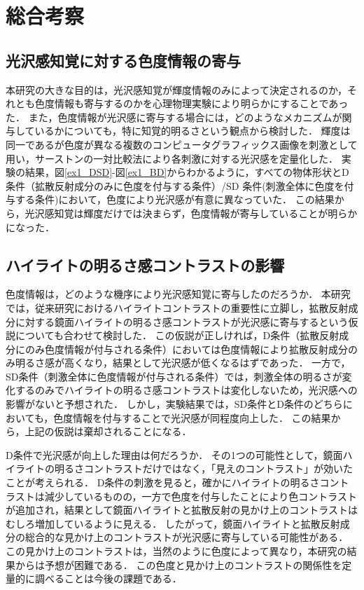 \chapter{総合考察}
    \section{光沢感知覚に対する色度情報の寄与}
        本研究の大きな目的は，光沢感知覚が輝度情報のみによって決定されるのか，それとも色度情報も寄与するのかを心理物理実験により明らかにすることであった．
        また，色度情報が光沢感に寄与する場合には，どのようなメカニズムが関与しているかについても，特に知覚的明るさという観点から検討した．
        輝度は同一であるが色度が異なる複数のコンピュータグラフィックス画像を刺激として用い，サーストンの一対比較法により各刺激に対する光沢感を定量化した．
        実験の結果，図\ref{ex1_DSD}-図\ref{ex1_BD}からわかるように，すべての物体形状とD条件（拡散反射成分のみに色度を付与する条件）/SD 条件(刺激全体に色度を付与する条件)において，色度により光沢感が有意に異なっていた．
        この結果から，光沢感知覚は輝度だけでは決まらず，色度情報が寄与していることが明らかになった．

    \section{ハイライトの明るさ感コントラストの影響}
        色度情報は，どのような機序により光沢感知覚に寄与したのだろうか．
        本研究では，従来研究におけるハイライトコントラストの重要性に立脚し，拡散反射成分に対する鏡面ハイライトの明るさ感コントラストが光沢感に寄与するという仮説についても合わせて検討した．
        この仮説が正しければ，D条件（拡散反射成分にのみ色度情報が付与される条件）においては色度情報により拡散反射成分のみ明るさ感が高くなり，結果として光沢感が低くなるはずであった．
        一方で，SD条件（刺激全体に色度情報が付与される条件）では，刺激全体の明るさが変化するのみでハイライトの明るさ感コントラストは変化しないため，光沢感への影響がないと予想された．
        しかし，実験結果では，SD条件とD条件のどちらにおいても，色度情報を付与することで光沢感が同程度向上した．
        この結果から，上記の仮説は棄却されることになる．

        D条件で光沢感が向上した理由は何だろうか．
        その1つの可能性として，鏡面ハイライトの明るさコントラストだけではなく，「見えのコントラスト」が効いたことが考えられる．
        D条件の刺激を見ると，確かにハイライトの明るさコントラストは減少しているものの，一方で色度を付与したことにより色コントラストが追加され，結果として鏡面ハイライトと拡散反射の見かけ上のコントラストはむしろ増加しているように見える．
        したがって，鏡面ハイライトと拡散反射成分の総合的な見かけ上のコントラストが光沢感に寄与している可能性がある．
        この見かけ上のコントラストは，当然のように色度によって異なり，本研究の結果からは予想が困難である．
        この色度と見かけ上のコントラストの関係性を定量的に調べることは今後の課題である．

